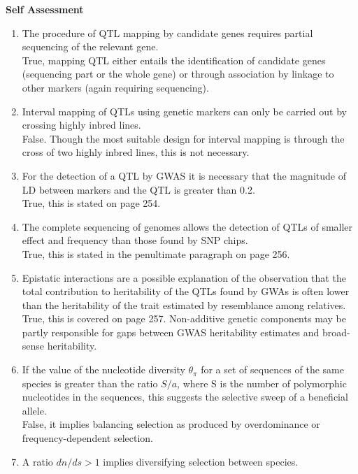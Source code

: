 \documentclass[12pt]{amsart}
\begin{document}
{\large \bf Self Assessment}
\begin{enumerate}
\item The procedure of QTL mapping by candidate genes requires partial sequencing of the relevant gene.\\
True, mapping QTL either entails the identification of candidate genes (sequencing part or the whole gene) or through association by linkage to other markers (again requiring sequencing).
\item Interval mapping of QTLs using genetic markers can only be carried out by crossing highly inbred lines.\\
False. Though the most suitable design for interval mapping is through the cross of two highly inbred lines, this is not necessary.\\
\item For the detection of a QTL by GWAS it is necessary that the magnitude of LD between markers and the QTL is greater than 0.2.\\
True, this is stated on page 254. \\
\item The complete sequencing of genomes allows the detection of QTLs of smaller effect and frequency than those found by SNP chips.\\
True, this is stated in the penultimate paragraph on page 256.\\
\item Epistatic interactions are a possible explanation of the observation that the total contribution to heritability of the QTLs found by GWAs is often lower than the heritability of the trait estimated by resemblance among relatives.\\
True, this is covered on page 257. Non-additive genetic components may be partly responsible for gaps between GWAS heritability estimates and broad-sense heritability.\\
\item If the value of the nucleotide diversity $\theta_{\pi}$ for a set of sequences of the same species is greater than the ratio $S/a$, where S is the number of polymorphic nucleotides in the sequences, this suggests the selective sweep of a beneficial allele.\\
False, it implies balancing selection as produced by overdominance or frequency-dependent selection.\\
\item A ratio $dn/ds >1$ implies diversifying selection between species.\\

\end{enumerate}
\end{document}
